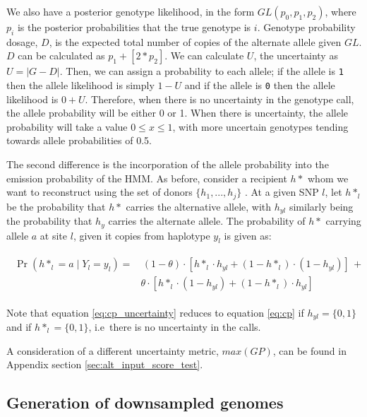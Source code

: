 {We also have a posterior genotype likelihood, in the form $GL(p_{0}, p_{1}, p_{2})$, where $p_i$ is the posterior probabilities that the true genotype is $i$. Genotype probability dosage, $D$, is the expected total number of copies of the alternate allele given $GL$. $D$ can be calculated as $p_{1} + [2*p_{2}]$. We can calculate $U$, the uncertainty as $U = |G-D|$. Then, we can assign a probability to each allele; if the allele is \texttt{1} then the allele likelihood is simply $1 - U$ and if the allele is \texttt{0} then the allele likelihood is $0 + U$. Therefore, when there is no uncertainty in the genotype call, the allele probability will be either 0 or 1. When there is uncertainty, the allele probability will take a value $0 \leq x \leq 1$, with more uncertain genotypes tending towards allele probabilities of 0.5. 



                 
The second difference is the incorporation of the allele probability into the emission probability of the HMM. As before, consider a recipient $h*$ whom we want to reconstruct using the set of donors $\{h_{1}, ..., h_{j}\}$ . At a given SNP $l$, let $h*_{l}$ be the probability that $h*$ carries the alternative allele, with $h_{yl}$ similarly being the probability that $h_{y}$ carries the alternate allele. The probability of $h*$ carrying allele $a$ at site $l$, given it copies from haplotype $y_{l}$ is given as:

\begin{align} \label{eq:cp_uncertainty}
\begin{split}
	\Pr(h*_{l} = a \mid Y_{l} = y_{l}) = &
				\,(1 - \theta) \cdot [h*_{l} \cdot h_{yl} + (1-h*_{l}) \cdot (1-h_{yl})]\, +  \\
				& \theta \cdot [h*_{l} \cdot (1-h_{yl}) + (1-h*_{l}) \cdot h_{yl}]
\end{split}
\end{align}

Note that equation \ref{eq:cp_uncertainty} reduces to equation \ref{eq:cp} if $h_{yl} = \{0,1\}$ and if $h*_{l} = \{0,1\}$, i.e\ there is no uncertainty in the calls.

A consideration of a different uncertainty metric, $max(GP)$, can be found in Appendix section \ref{sec:alt_input_score_test}.


\subsection{Generation of downsampled genomes}

}
